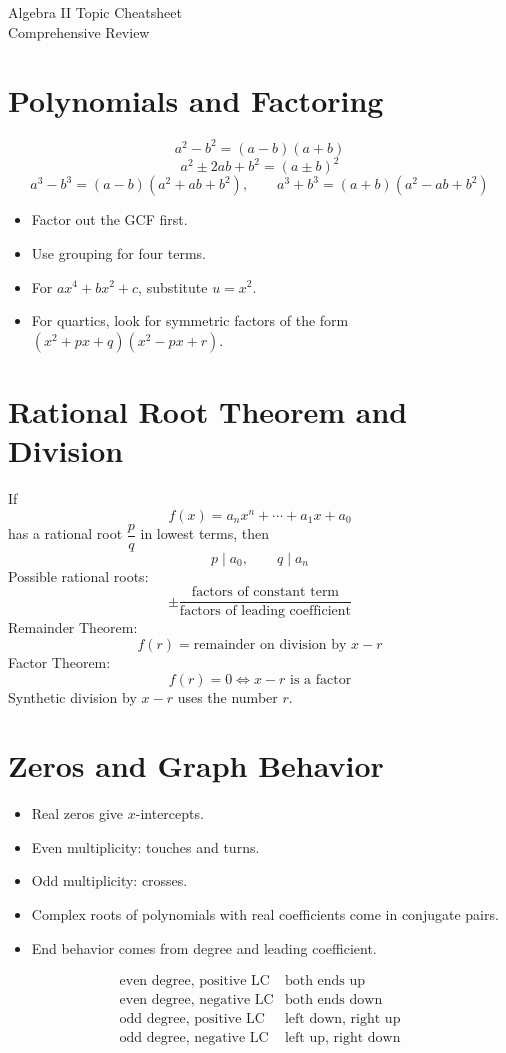 \documentclass[11pt]{article}
\begin{document}
\begin{center}
{\LARGE Algebra II Topic Cheatsheet}\\[0.4em]
{\large Comprehensive Review}
\end{center}

\section*{Polynomials and Factoring}
\[
a^2-b^2=(a-b)(a+b)
\]
\[
a^2\pm 2ab+b^2=(a\pm b)^2
\]
\[
a^3-b^3=(a-b)(a^2+ab+b^2),\qquad
a^3+b^3=(a+b)(a^2-ab+b^2)
\]
\begin{itemize}
  \item Factor out the GCF first.
  \item Use grouping for four terms.
  \item For $ax^4+bx^2+c$, substitute $u=x^2$.
  \item For quartics, look for symmetric factors of the form $(x^2+px+q)(x^2-px+r)$.
\end{itemize}

\section*{Rational Root Theorem and Division}
If
\[
f(x)=a_nx^n+\cdots+a_1x+a_0
\]
has a rational root $\dfrac{p}{q}$ in lowest terms, then
\[
p\mid a_0,\qquad q\mid a_n
\]
Possible rational roots:
\[
\pm \frac{\text{factors of constant term}}{\text{factors of leading coefficient}}
\]
Remainder Theorem:
\[
f(r)=\text{remainder on division by }x-r
\]
Factor Theorem:
\[
f(r)=0 \iff x-r\text{ is a factor}
\]
Synthetic division by $x-r$ uses the number $r$.

\section*{Zeros and Graph Behavior}
\begin{itemize}
  \item Real zeros give $x$-intercepts.
  \item Even multiplicity: touches and turns.
  \item Odd multiplicity: crosses.
  \item Complex roots of polynomials with real coefficients come in conjugate pairs.
  \item End behavior comes from degree and leading coefficient.
\end{itemize}
\[
\begin{array}{ll}
\text{even degree, positive LC} & \text{both ends up} \\
\text{even degree, negative LC} & \text{both ends down} \\
\text{odd degree, positive LC} & \text{left down, right up} \\
\text{odd degree, negative LC} & \text{left up, right down}
\end{array}
\]
\end{document}
